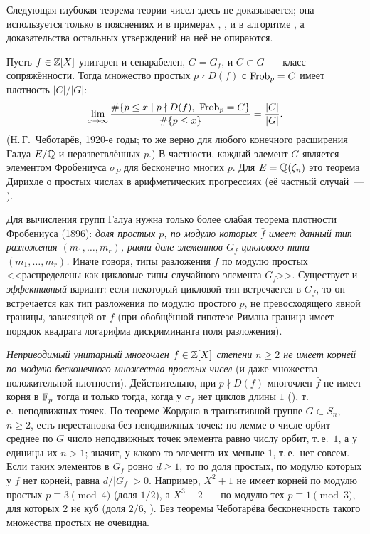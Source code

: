 \begin{aside}
Следующая глубокая теорема теории чисел здесь не доказывается; она используется только в пояснениях и в примерах
, ,  и в алгоритме , а доказательства остальных утверждений на неё не опираются.

Пусть $f\in\mathbb Z[X]$ унитарен и сепарабелен, $G=G_f$, и $C\subset G$~--- класс сопряжённости. Тогда множество простых
$p\nmid D(f)$ с $\operatorname{Frob}_p=C$ имеет плотность $|C|/|G|$:
\[
\lim_{x\to\infty}\frac{\#\{p\le x\mid p\nmid D(f),\ \operatorname{Frob}_p=C\}}{\#\{p\le x\}}=\frac{|C|}{|G|}.
\]
(Н.\,Г.~Чеботарёв, 1920-е годы; то же верно для любого конечного расширения Галуа $E/\mathbb Q$ и неразветвлённых $p$.) В
частности, каждый элемент $G$ является элементом Фробениуса $\sigma_P$ для бесконечно многих $p$. Для
$E=\mathbb Q(\zeta_n)$ это теорема Дирихле о простых числах в арифметических прогрессиях (её частный случай~--- ).

Для вычисления групп Галуа нужна только более слабая теорема плотности Фробениуса (1896): \emph{доля простых $p$, по
модулю которых $\bar f$ имеет данный тип разложения $(m_1,\dots,m_r)$, равна доле элементов $G_f$ циклового типа
$(m_1,\dots,m_r)$.} Иначе говоря, типы разложения $f$ по модулю простых <<распределены как цикловые типы случайного
элемента $G_f$>>. Существует и \emph{эффективный} вариант: если некоторый цикловой тип встречается в $G_f$, то он
встречается как тип разложения по модулю простого $p$, не превосходящего явной границы, зависящей от $f$ (при
обобщённой гипотезе Римана граница имеет порядок квадрата логарифма дискриминанта поля разложения).
\end{aside}

\begin{example}[4.29b]
\emph{Неприводимый унитарный многочлен $f\in\mathbb Z[X]$ степени $n\ge2$ не имеет корней по модулю бесконечного множества простых
чисел} (и даже множества положительной плотности). Действительно, при $p\nmid D(f)$ многочлен $\bar f$ не имеет корня
в $\mathbb F_p$ тогда и только тогда, когда у $\sigma_f$ нет циклов длины $1$ (), т.\,е.\ неподвижных точек. По теореме
Жордана в транзитивной группе $G\subset S_n$, $n\ge2$, есть перестановка без неподвижных точек: по лемме о числе орбит
среднее по $G$ число неподвижных точек элемента равно числу орбит, т.\,е.\ $1$, а у единицы их $n>1$; значит, у
какого-то элемента их меньше $1$, т.\,е.\ нет совсем. Если таких элементов в $G_f$ ровно $d\ge1$, то по  доля
простых, по модулю которых у $f$ нет корней, равна $d/|G_f|>0$. Например, $X^2+1$ не имеет корней по модулю простых
$p\equiv3\pmod4$ (доля $1/2$), а $X^3-2$~--- по модулю тех $p\equiv1\pmod3$, для которых $2$ не куб (доля $2/6$, ).
Без теоремы Чеботарёва бесконечность такого множества простых не очевидна.
\end{example}

